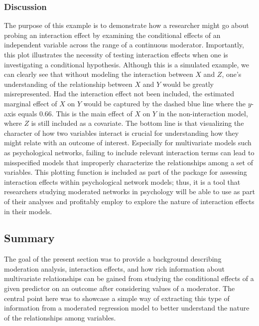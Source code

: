 \subsubsection{Discussion}
The purpose of this example is to demonstrate how a researcher might go about probing an interaction effect by examining the conditional effects of an independent variable across the range of a continuous moderator. Importantly, this plot illustrates the necessity of testing interaction effects when one is investigating a conditional hypothesis. Although this is a simulated example, we can clearly see that without modeling the interaction between $X$ and $Z$, one's understanding of the relationship between $X$ and $Y$ would be greatly misrepresented. Had the interaction effect not been included, the estimated marginal effect of $X$ on $Y$ would be captured by the dashed blue line where the $y$-axis equals $0.66$. This is the main effect of $X$ on $Y$ in the non-interaction model, where $Z$ is still included as a covariate. The bottom line is that visualizing the character of how two variables interact is crucial for understanding how they might relate with an outcome of interest. Especially for multivariate models such as psychological networks, failing to include relevant interaction terms can lead to misspecified models that improperly characterize the relationships among a set of variables. This plotting function is included as part of the  package for assessing interaction effects within psychological network models; thus, it is a tool that researchers studying moderated networks in psychology will be able to use as part of their analyses and profitably employ to explore the nature of interaction effects in their models. 

\subsection{Summary}
The goal of the present section was to provide a background describing moderation analysis, interaction effects, and how rich information about multivariate relationships can be gained from studying the conditional effects of a given predictor on an outcome after considering values of a moderator. The central point here was to showcase a simple way of extracting this type of information from a moderated regression model to better understand the nature of the relationships among variables.

